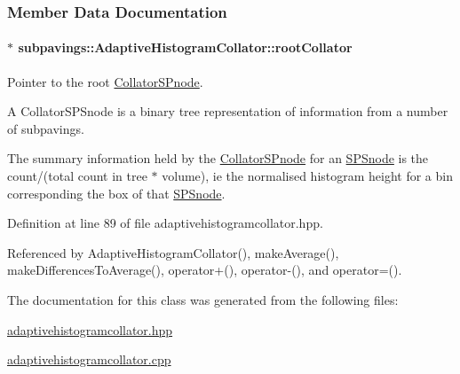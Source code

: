 \subsubsection{\-Member \-Data \-Documentation}
\hypertarget{classsubpavings_1_1AdaptiveHistogramCollator_a5ae0bb810e0f19142964b9508f799b60}{
\paragraph[{root\-Collator}]{$\ast$ {\bf subpavings\-::\-Adaptive\-Histogram\-Collator\-::root\-Collator}}}\label{classsubpavings_1_1AdaptiveHistogramCollator_a5ae0bb810e0f19142964b9508f799b60}


\-Pointer to the root \hyperlink{classsubpavings_1_1CollatorSPnode}{\-Collator\-S\-Pnode}. 

\-A \-Collator\-S\-P\-Snode is a binary tree representation of information from a number of subpavings.

\-The summary information held by the \hyperlink{classsubpavings_1_1CollatorSPnode}{\-Collator\-S\-Pnode} for an \hyperlink{classsubpavings_1_1SPSnode}{\-S\-P\-Snode} is the count/(total count in tree $\ast$ volume), ie the normalised histogram height for a bin corresponding the box of that \hyperlink{classsubpavings_1_1SPSnode}{\-S\-P\-Snode}. 

\-Definition at line 89 of file adaptivehistogramcollator.\-hpp.



\-Referenced by \-Adaptive\-Histogram\-Collator(), make\-Average(), make\-Differences\-To\-Average(), operator+(), operator-\/(), and operator=().



\-The documentation for this class was generated from the following files\-:\begin{DoxyCompactItemize}
\item 
\hyperlink{adaptivehistogramcollator_8hpp}{adaptivehistogramcollator.\-hpp}\item 
\hyperlink{adaptivehistogramcollator_8cpp}{adaptivehistogramcollator.\-cpp}\end{DoxyCompactItemize}
